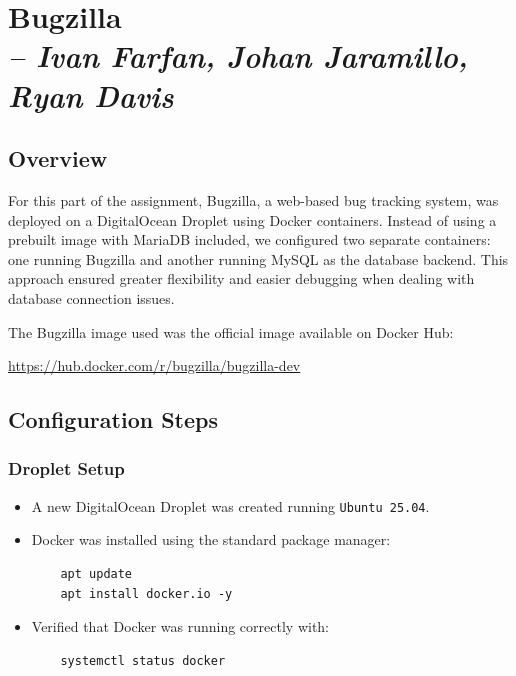\chapter{Bugzilla \\ 
\small{\textit{-- Ivan Farfan, Johan Jaramillo, Ryan Davis}}} 
  \label{Chapter::Bugzilla}
\section{Overview}

For this part of the assignment, Bugzilla, a web-based bug tracking system, was deployed on a DigitalOcean Droplet using Docker containers. Instead of using a prebuilt image with MariaDB included, we configured two separate containers: one running Bugzilla and another running MySQL as the database backend. This approach ensured greater flexibility and easier debugging when dealing with database connection issues.

\noindent
The Bugzilla image used was the official image available on Docker Hub:

\begin{center}
\url{https://hub.docker.com/r/bugzilla/bugzilla-dev}
\end{center}

\section{Configuration Steps}
\subsection{Droplet Setup}
\begin{itemize}
    \item A new DigitalOcean Droplet was created running \texttt{Ubuntu 25.04}.
    \item Docker was installed using the standard package manager:
    \begin{verbatim}
    apt update
    apt install docker.io -y
    \end{verbatim}
    \item Verified that Docker was running correctly with:
    \begin{verbatim}
    systemctl status docker
    \end{verbatim}
\end{itemize}

